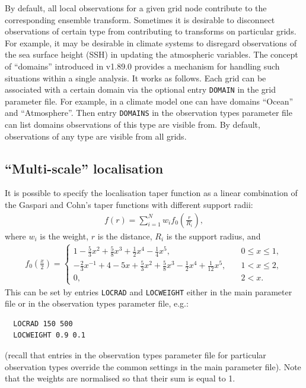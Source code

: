\documentclass[11pt]{report}
\begin{document}
By default, all local observations for a given grid node contribute to the corresponding ensemble transform.
Sometimes it is desirable to disconnect observations of certain type from contributing to transforms on particular grids.
For example, it may be desirable in climate systems to disregard observations of the sea surface height (SSH) in updating the atmospheric variables.
The concept of ``domains'' introduced in v1.89.0 provides a mechanism for handling such situations within a single analysis.
It works as follows.
Each grid can be associated with a certain domain via the optional entry \verb|DOMAIN| in the grid parameter file.
For example, in a climate model one can have domains ``Ocean'' and ``Atmosphere''.
Then entry \verb|DOMAINS| in the observation types parameter file can list domains observations of this type are visible from.
By default, observations of any type are visible from all grids.

\subsection {``Multi-scale'' localisation}

It is possible to specify the localisation taper function as a linear combination of the Gaspari and Cohn's taper functions with different support radii:
\begin{align*}
  f(r) = \sum_{i=1}^N w_i f_0(\frac{r}{R_i}),
\end{align*}
where $w_i$ is the weight, $r$ is the distance, $R_i$ is the support radius, and
\begin{align*}
  f_0(\frac{x}{2}) = \left\{
  \begin{array}{ll}
    1 - \frac{5}{3} x^2 + \frac{5}{8} x^3 + \frac{1}{2} x^4 -\frac{1}{4} x^5, \quad & 0 \le x \le 1,\\
    -\frac{2}{3} x^{-1} + 4 - 5x + \frac{5}{3}x^2 + \frac{5}{8}x^3 - \frac{1}{2} x^4 + \frac{1}{12}x^5, \quad & 1 < x \le 2,\\
    0, \quad & 2 < x.
  \end{array}
  \right.
\end{align*}
This can be set by entries \verb|LOCRAD| and \verb|LOCWEIGHT| either in the main parameter file or in the observation types parameter file, e.g.:
\begin{Verbatim}
  LOCRAD 150 500
  LOCWEIGHT 0.9 0.1
\end{Verbatim}
(recall that entries in the observation types parameter file for particular observation types override the common settings in the main parameter file).
Note that the weights are normalised so that their sum is equal to 1.
\end{document}
